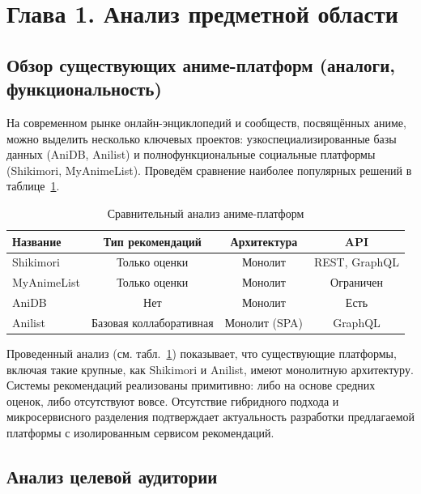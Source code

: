 

\section*{Глава 1. Анализ предметной области}

\subsection{Обзор существующих аниме-платформ (аналоги, функциональность)}

На современном рынке онлайн-энциклопедий и сообществ, посвящённых аниме, можно выделить несколько ключевых проектов: узкоспециализированные базы данных (AniDB, Anilist) и полнофункциональные социальные платформы (Shikimori, MyAnimeList). Проведём сравнение наиболее популярных решений в таблице~\ref{tab:anime_platforms}.

\begin{table}[ht!]
	\small
	\centering
	\caption{Сравнительный анализ аниме-платформ}
	\label{tab:anime_platforms}
	\begin{tabular}{|l|c|c|c|}
		\hline
		\textbf{Название} & \textbf{Тип рекомендаций} & \textbf{Архитектура} & \textbf{API} \\ \hline
		Shikimori & Только оценки & Монолит & REST, GraphQL \\ \hline
		MyAnimeList & Только оценки & Монолит & Ограничен \\ \hline
		AniDB & Нет & Монолит & Есть \\ \hline
		Anilist & Базовая коллаборативная & Монолит (SPA) & GraphQL \\ \hline
	\end{tabular}
\end{table}

Проведенный анализ (см. табл.~\ref{tab:anime_platforms}) показывает, что существующие платформы, включая такие крупные, как Shikimori и Anilist, имеют монолитную архитектуру. Системы рекомендаций реализованы примитивно: либо на основе средних оценок, либо отсутствуют вовсе. Отсутствие гибридного подхода и микросервисного разделения подтверждает актуальность разработки предлагаемой платформы с изолированным сервисом рекомендаций.
\\
\subsection{Анализ целевой аудитории}

